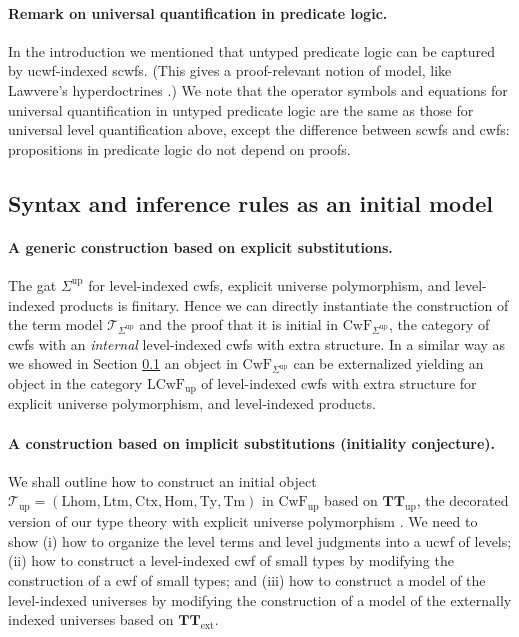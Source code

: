 \documentclass[11pt,a4paper]{article}
\theoremstyle{plain}
\theoremstyle{definition}
\newcommand{\Ctx}{\mathrm{Ctx}}
\newcommand{\Sub}{\mathrm{Hom}}
\newcommand{\Ty}{\mathrm{Ty}}
\newcommand{\Tm}{\mathrm{Tm}}
\newcommand{\Lsub}{\mathrm{Lhom}}
\newcommand{\Ltm}{\mathrm{Ltm}}
\newcommand{\T}{\mathsf{T}}
\def\T{\mathcal{T}}
\def\CwF{\mathrm{CwF}}
\def\CwFint{\mathrm{CwF_{up}}}
\def\LCwF{\mathrm{LCwF}}
\def\LCwFint{\LCwF_{\mathrm{up}}}
\def\Sigmaint{{\Sigma^\mathrm{up}}}
\def\TText{{\mathbf{TT}_\mathrm{ext}}}
\def\TTint{{\mathbf{TT}_\mathrm{up}}}
\def\Tint{\T_\mathrm{up}}
\begin{document}
\paragraph{Remark on universal quantification in predicate logic.}

In the introduction we mentioned that untyped predicate logic can be captured by ucwf-indexed scwfs. (This gives a proof-relevant notion of model, like Lawvere's hyperdoctrines \cite{lawvere:hyperdoctrines}.) We note that the operator symbols and equations for universal quantification in untyped predicate logic are the same as those for universal level quantification above, except the difference between scwfs and cwfs: propositions in predicate logic do not depend on proofs.

\subsection{Syntax and inference rules as an initial model}\label{initiality-internal}

\paragraph{A generic construction based on explicit substitutions.} The gat $\Sigmaint$ for level-indexed cwfs, explicit universe polymorphism, and level-indexed products is finitary. Hence we can directly instantiate the construction of the term model $\T_{\Sigmaint}$ \cite{bezem:hofmann} and the proof that it is initial in $\CwF_{\Sigmaint}$, the category of cwfs with an {\em internal} level-indexed cwfs with extra structure. In a similar way as we showed in Section \ref{initiality-internal} an object in $\CwF_{\Sigmaint}$ can be externalized yielding an object in the category $\LCwFint$ of level-indexed cwfs with extra structure for explicit universe polymorphism, and level-indexed products.

\paragraph{A construction based on implicit substitutions (initiality conjecture).} We shall outline how to construct an initial object $\Tint = (\Lsub,\Ltm,\Ctx,\Sub,\Ty,\Tm)$ in $\CwFint$ based on $\TTint$, the decorated version of our type theory with explicit universe polymorphism \cite{BezemCDE22}. 
We need to show (i) how to organize the level terms and level judgments into a ucwf of levels; (ii) how to construct a level-indexed cwf of small types by modifying the construction of a cwf of small types; and (iii) how to construct a model of the level-indexed universes by modifying the construction of a model of the externally indexed universes based on $\TText$.
\end{document}
